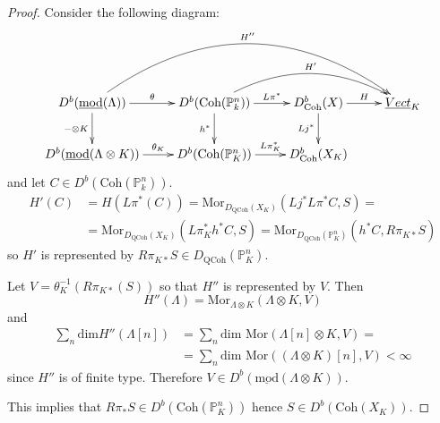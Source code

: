 \documentclass{amsart}
\begin{document}
\begin{proof}
Consider the following diagram:
$$\xymatrix{
D^{b}(\underline{\mathrm{mod}}(\Lambda)) \ar[r]^-{\theta} \ar@/^4pc/ [rrr] ^{H''} \ar[d]_{-\otimes K}
&D^{b}(\text{Coh}({\mathbb{P}}^{n}_{k})) \ar[r]^-{L\pi^{*}} \ar@/^2pc/ [rr]^-{H'} \ar[d]_-{h^{*}} 
&D^{b}_{\mathrm{Coh}}(X) \ar[r]^-{H} \ar[d]_-{Lj^{*}} 
& \underline{Vect}_{K}\\
D^{b}(\underline{\mathrm{mod}}(\Lambda\otimes K)) \ar[r] ^-{\theta_{K}}  &D^{b}(\text{Coh}({\mathbb{P}}^{n}_{K})) \ar[r]^-{L\pi_{K}^{*}} 
&D^{b}_{\mathrm{Coh}}(X_{K}) 
}$$
and let $C\in D^{b}(\mathrm{Coh}({\mathbb{P}}^{n}_{k}))$.
\begin{align*}
H'(C) &=H(L\pi^{*}(C))=\text{Mor}_{D_{\mathrm{QCoh}}(X_{K})}(Lj^{*}L\pi^{*}C,S)= \\
&=\text{Mor}_{D_{\mathrm{QCoh}}(X_{K})}(L\pi_{K}^{*}h^{*}C,S)=\text{Mor}_{D_{\mathrm{QCoh}}({\mathbb{P}}^{n}_{K})}(h^{*}C,R\pi_{K*}S)
\end{align*}
so $H'$ is represented by $R\pi_{K*}S\in D_{\mathrm{QCoh}}({\mathbb{P}}^{n}_{K})$.

Let $V=\theta_{K}^{-1}(R\pi_{K*}(S))$ so that $H''$ is represented by $V$. Then
$$H''(\Lambda)=\text{Mor}_{\Lambda\otimes K}(\Lambda\otimes K,V)$$
and
\begin{align*} 
\sum_{n}\mbox{dim} H''(\Lambda[n]) &=\sum_{n} \mbox{dim Mor} (\Lambda[n]\otimes K,V)=\\
&=\sum_{n}\mbox{dim Mor} ((\Lambda\otimes K)[n],V)<\infty
\end{align*}
since $H''$ is of finite type. Therefore $V\in D^{b}(\underline{\mathrm{mod}}(\Lambda\otimes K))$.

This implies that $R\pi_{*}S\in D^{b}(\mathrm{Coh}({\mathbb{P}}^{n}_{K}))$ hence $S\in D^{b}(\mathrm{Coh}(X_{K}))$.
\end{proof}
\end{document}
